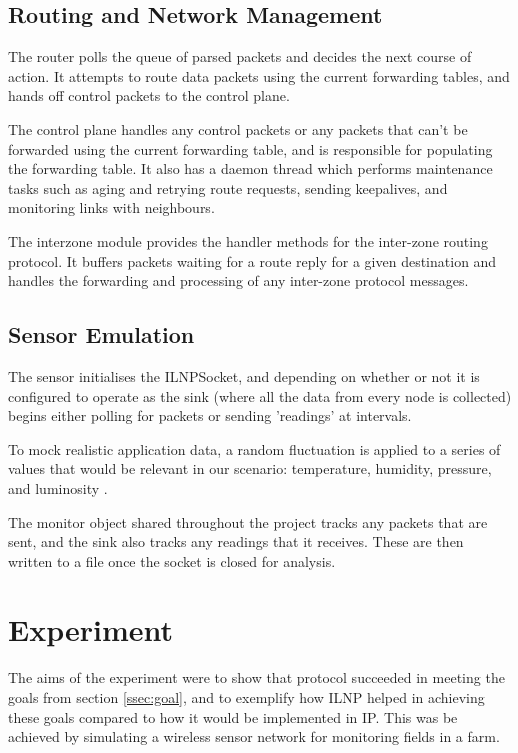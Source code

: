 \documentclass[12pt]{article}
\begin{document}
\subsection{Routing and Network Management}

The router polls the queue of parsed packets and decides the next course of action. It attempts to route data packets using the current forwarding tables, and hands off control packets to the control plane. 

The control plane handles any control packets or any packets that can't be forwarded using the current forwarding table, and is responsible for populating the forwarding table. It also has a daemon thread which performs maintenance tasks such as aging and retrying route requests, sending keepalives, and monitoring links with neighbours.

The interzone module provides the handler methods for the inter-zone routing protocol. It buffers packets waiting for a route reply for a given destination and handles the forwarding and processing of any inter-zone protocol messages.

\subsection{Sensor Emulation}

The sensor initialises the ILNPSocket, and depending on whether or not it is configured to operate as the sink (where all the data from every node is collected) begins either polling for packets or sending 'readings' at intervals.

To mock realistic application data, a random fluctuation is applied to a series of values that would be relevant in our scenario: temperature, humidity, pressure, and luminosity \cite{agrisensor}.

The monitor object shared throughout the project tracks any packets that are sent, and the sink also tracks any readings that it receives. These are then written to a file once the socket is closed for analysis.

\pagebreak
\section{Experiment}

The aims of the experiment were to show that protocol succeeded in meeting the goals from section \ref{ssec:goal}, and to exemplify how ILNP helped in achieving these goals compared to how it would be implemented in IP. This was be achieved by simulating a wireless sensor network for monitoring fields in a farm. 
\end{document}
